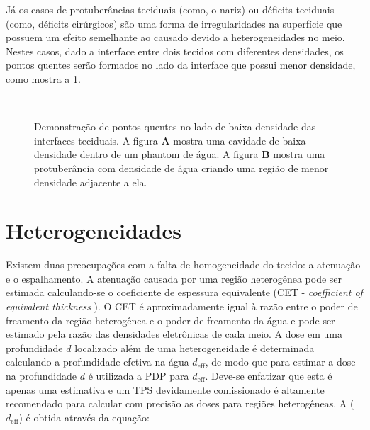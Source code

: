 \documentclass[11pt,a4paper]{article}
\begin{document}
	Já os casos de protuberâncias teciduais (como, o nariz) ou déficits teciduais (como, déficits cirúrgicos) são uma forma de irregularidades na superfície que possuem um efeito semelhante ao causado devido a heterogeneidades no meio. Nestes casos, dado a interface entre dois tecidos com diferentes densidades, os pontos quentes serão formados no lado da interface que possui menor densidade, como mostra a \ref{fig:hotspots}.
	
	\begin{figure}[h]
		\centering
		 \\ %
		\caption{Demonstração de pontos quentes no lado de baixa densidade das interfaces teciduais. A figura \textbf{A} mostra uma cavidade de baixa densidade dentro de um phantom de água. A figura \textbf{B} mostra uma protuberância com densidade de água criando uma região de menor densidade adjacente a ela.}
		\label{fig:hotspots}
	\end{figure}


\section{Heterogeneidades}

	Existem duas preocupações com a falta de homogeneidade do tecido: a atenuação e o espalhamento. A atenuação causada por uma região heterogênea pode ser estimada calculando-se o coeficiente de espessura equivalente (CET - \textit{ coefficient of equivalent thickness} ). O CET é aproximadamente igual à razão entre o poder de freamento da região heterogênea e o poder de freamento da água e pode ser estimado pela razão das densidades eletrônicas de cada meio. A dose em uma profundidade $d$ localizado além de uma heterogeneidade é determinada calculando a profundidade efetiva na água $d_{\text{eff}}$, de modo que para estimar a dose na profundidade $d$ é utilizada a PDP para $d_{\text{eff}}$. Deve-se enfatizar que esta é apenas uma estimativa e um TPS devidamente comissionado é altamente recomendado para calcular com precisão as doses para regiões heterogêneas. A ($d_{\text{eff}}$) é obtida através da equação:
\end{document}
